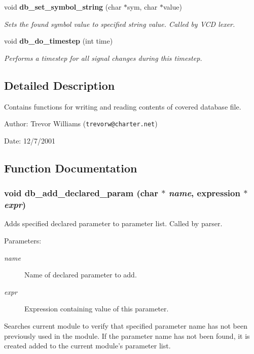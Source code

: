 \begin{CompactItemize}
void {\bf db\_\-set\_\-symbol\_\-string} (char $\ast$sym, char $\ast$value)
\begin{CompactList}\small\item\em Sets the found symbol value to specified string value. Called by VCD lexer. \item\end{CompactList}\item 
void {\bf db\_\-do\_\-timestep} (int time)
\begin{CompactList}\small\item\em Performs a timestep for all signal changes during this timestep. \item\end{CompactList}\end{CompactItemize}


\subsection{Detailed Description}
Contains functions for writing and reading contents of covered database file. 

\begin{Desc}
\item[Author:]Trevor Williams ({\tt trevorw@charter.net}) \end{Desc}
\begin{Desc}
\item[Date:]12/7/2001 \end{Desc}


\subsection{Function Documentation}
\subsubsection{\setlength{\rightskip}{0pt plus 5cm}void db\_\-add\_\-declared\_\-param (char $\ast$ {\em name}, {\bf expression} $\ast$ {\em expr})}\label{db_8h_a4}


Adds specified declared parameter to parameter list. Called by parser. 

\begin{Desc}
\item[Parameters:]
\begin{description}
\item[{\em name}]Name of declared parameter to add. \item[{\em expr}]Expression containing value of this parameter.\end{description}
\end{Desc}
Searches current module to verify that specified parameter name has not been previously used in the module. If the parameter name has not been found, it is created added to the current module's parameter list. 

